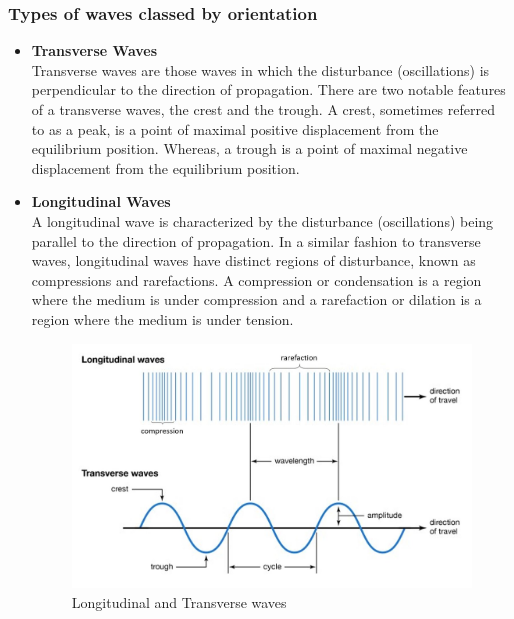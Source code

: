 \subsubsection{Types of waves classed by orientation}
\begin{itemize}
    \item \textbf{Transverse Waves} \\
    Transverse waves are those waves in which the disturbance (oscillations) is perpendicular to the direction of propagation. There are two notable features of a transverse waves, the crest and the trough. A crest, sometimes referred to as a peak, is a point of maximal positive displacement from the equilibrium position. Whereas, a trough is a point of maximal negative displacement from the equilibrium position. 
    \item \textbf{Longitudinal Waves} \\
    A longitudinal wave is characterized by the disturbance (oscillations) being parallel to the direction of propagation. In a similar fashion to transverse waves, longitudinal waves have distinct
    regions of disturbance, known as compressions and rarefactions. A compression or condensation is a region where the medium is under compression and a rarefaction or dilation is a region where the medium is under tension.  
    
    \begin{figure}[h!]
        \centering
        \includegraphics[scale=0.7]{notes/images/Waves-1.JPG}
        \caption{Longitudinal and Transverse waves}
    \end{figure}
    \FloatBarrier
\end{itemize}

